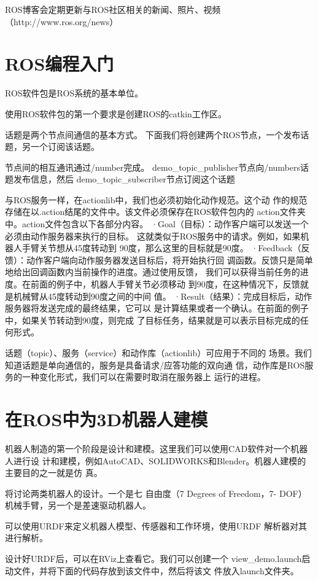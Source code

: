 \documentclass[a4paper]{article}
\begin{document}
ROS博客会定期更新与ROS社区相关的新闻、照片、视频
（http://www.ros.org/news）

\section{ROS编程入门}
ROS软件包是ROS系统的基本单位。

使用ROS软件包的第一个要求是创建ROS的catkin工作区。

话题是两个节点间通信的基本方式。
下面我们将创建两个ROS节点，一个发布话题，另一个订阅该话题。

节点间的相互通讯通过/number完成。
demo\_topic\_publisher节点向/numbers话题发布信息，然后
demo\_topic\_subscriber节点订阅这个话题

与ROS服务一样，在actionlib中，我们也必须初始化动作规范。这个动
作的规范存储在以.action结尾的文件中。该文件必须保存在ROS软件包内的
action文件夹中。action文件包含以下各部分内容。
·Goal（目标）：动作客户端可以发送一个必须由动作服务器来执行的目标。
这就类似于ROS服务中的请求。例如，如果机器人手臂关节想从45度转动到
90度，那么这里的目标就是90度。
·Feedback（反馈）：动作客户端向动作服务器发送目标后，将开始执行回
调函数。反馈只是简单地给出回调函数内当前操作的进度。通过使用反馈，
我们可以获得当前任务的进度。在前面的例子中，机器人手臂关节必须移动
到90度，在这种情况下，反馈就是机械臂从45度转动到90度之间的中间
值。
·Result（结果）：完成目标后，动作服务器将发送完成的最终结果，它可以
是计算结果或者一个确认。在前面的例子中，如果关节转动到90度，则完成
了目标任务，结果就是可以表示目标完成的任何形式。

话题（topic）、服务（service）和动作库（actionlib）可应用于不同的
场景。我们知道话题是单向通信的，服务是具备请求/应答功能的双向通
信，动作库是ROS服务的一种变化形式，我们可以在需要时取消在服务器上
运行的进程。

\section{在ROS中为3D机器人建模}
机器人制造的第一个阶段是设计和建模。这里我们可以使用CAD软件对一个机器人进行设
计和建模，例如AutoCAD、SOLIDWORKS和Blender。机器人建模的主要目的之一就是仿
真。

将讨论两类机器人的设计。一个是七 自由度（7 Degrees of Freedom，7-
DOF）机械手臂，另一个是差速驱动机器人。

可以使用URDF来定义机器人模型、传感器和工作环境，使用URDF
解析器对其进行解析。

设计好URDF后，可以在RViz上查看它。我们可以创建一个
view\_demo.launch启动文件，并将下面的代码存放到该文件中，然后将该文
件放入launch文件夹。
\end{document}

